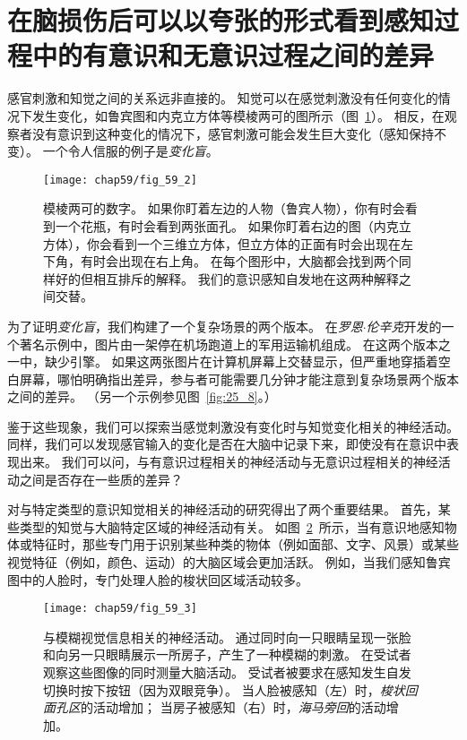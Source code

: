 \section{在脑损伤后可以以夸张的形式看到感知过程中的有意识和无意识过程之间的差异}

感官刺激和知觉之间的关系远非直接的。
知觉可以在感觉刺激没有任何变化的情况下发生变化，如鲁宾图和内克立方体等模棱两可的图所示（图~\ref{fig:59_2}）。
相反，在观察者没有意识到这种变化的情况下，感官刺激可能会发生巨大变化（感知保持不变）。
一个令人信服的例子是\textit{变化盲}。


\begin{figure}[htbp]
	\centering
	\texttt{[image: chap59/fig\_59\_2]}
	\caption{模棱两可的数字。
		如果你盯着左边的人物（鲁宾人物），你有时会看到一个花瓶，有时会看到两张面孔。
		如果你盯着右边的图（内克立方体），你会看到一个三维立方体，但立方体的正面有时会出现在左下角，有时会出现在右上角。
		在每个图形中，大脑都会找到两个同样好的但相互排斥的解释。
		我们的意识感知自发地在这两种解释之间交替。}
	\label{fig:59_2}
\end{figure}


为了证明\textit{变化盲}，我们构建了一个复杂场景的两个版本。
在\textit{罗恩$\cdot$伦辛克}开发的一个著名示例中，图片由一架停在机场跑道上的军用运输机组成。
在这两个版本之一中，缺少引擎。
如果这两张图片在计算机屏幕上交替显示，但严重地穿插着空白屏幕，哪怕明确指出差异，参与者可能需要几分钟才能注意到复杂场景两个版本之间的差异。
（另一个示例参见图~\ref{fig:25_8}。）


鉴于这些现象，我们可以探索当感觉刺激没有变化时与知觉变化相关的神经活动。
同样，我们可以发现感官输入的变化是否在大脑中记录下来，即使没有在意识中表现出来。
我们可以问，与有意识过程相关的神经活动与无意识过程相关的神经活动之间是否存在一些质的差异？


对与特定类型的意识知觉相关的神经活动的研究得出了两个重要结果。
首先，某些类型的知觉与大脑特定区域的神经活动有关。
如图~\ref{fig:59_3}~所示，当有意识地感知物体或特征时，那些专门用于识别某些种类的物体（例如面部、文字、风景）或某些视觉特征（例如，颜色、运动）的大脑区域会更加活跃。
例如，当我们感知鲁宾图中的人脸时，专门处理人脸的梭状回区域活动较多。


\begin{figure}[htbp]
	\centering
	\texttt{[image: chap59/fig\_59\_3]}
	\caption{与模糊视觉信息相关的神经活动。
		通过同时向一只眼睛呈现一张脸和向另一只眼睛展示一所房子，产生了一种模糊的刺激。
		在受试者观察这些图像的同时测量大脑活动。
		受试者被要求在感知发生自发切换时按下按钮（因为双眼竞争）。
		当人脸被感知（左）时，\textit{梭状回面孔区}的活动增加；
		当房子被感知（右）时，\textit{海马旁回}的活动增加\cite{tong1998binocular}。}
	\label{fig:59_3}
\end{figure}


